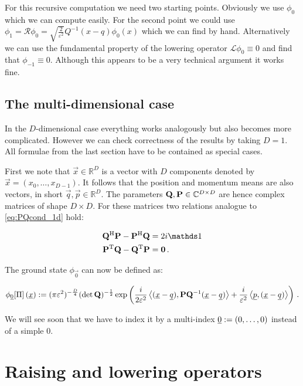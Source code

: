 For this recursive computation we need two starting points. Obviously we use
$\phi_0$ which we can compute easily. For the second point we could use
$\phi_1 = \mathcal{R} \phi_0 = \sqrt{\frac{2}{\varepsilon^2}} Q^{-1} (x-q) \phi_0(x)$
which we can find by hand. Alternatively we can use the fundamental property of
the lowering operator $\mathcal{L} \phi_0 \equiv 0$ and find that $\phi_{-1} \equiv 0$.
Although this appears to be a very technical argument it works fine.


\subsection{The multi-dimensional case}


In the $D$-dimensional case everything works analogously but also becomes more
complicated. However we can check correctness of the results by taking $D=1$.
All formulae from the last section have to be contained as special cases.

First we note that $\vec{x} \in \mathbb{R}^D$ is a vector with $D$ components
denoted by $\vec{x} = (x_0, \ldots, x_{D-1})$. It follows that the position and momentum
means are also vectors, in short $\vec{q}, \vec{p} \in \mathbb{R}^D$. The parameters
$\mathbf{Q}, \mathbf{P} \in \mathbb{C}^{D \times D}$ are hence complex matrices of shape
$D \times D$. For these matrices two relations analogue to \eqref{eq:PQcond_1d}
hold:

\begin{align} \label{eq:PQcond_Dd}
  \mat{Q}\H \mat{P} - \mat{P}\H \mat{Q} & = 2i \id \\
  \mat{P}\T \mat{Q} - \mat{Q}\T \mat{P} & = \mat{0} \,.
\end{align}

The ground state $\phi_{\vec{0}}$ can now be defined as:

\begin{align}  \label{eq:phi0_Dd}
  \phi_{\underline{0}}[\Pi]\left(\underline{x}\right)
  :=
  (\pi\varepsilon^2)^{-\frac{D}{4}} (\det\mathbf{Q})^{-\frac{1}{2}}
  \exp \left( \frac{i}{2\varepsilon^2}
  \left\langle (\underline{x}-\underline{q}) , \mathbf{P}\mathbf{Q}{}^{-1}(\underline{x}-\underline{q}) \right\rangle
  + \frac{i}{\varepsilon^2} \left\langle \underline{p} , (\underline{x}-\underline{q}) \right\rangle
 \right) \,.
\end{align}

We will see soon that we have to index it by a multi-index $\underline{0} := (0, \ldots, 0)$
instead of a simple $0$.


\section{Raising and lowering operators}


